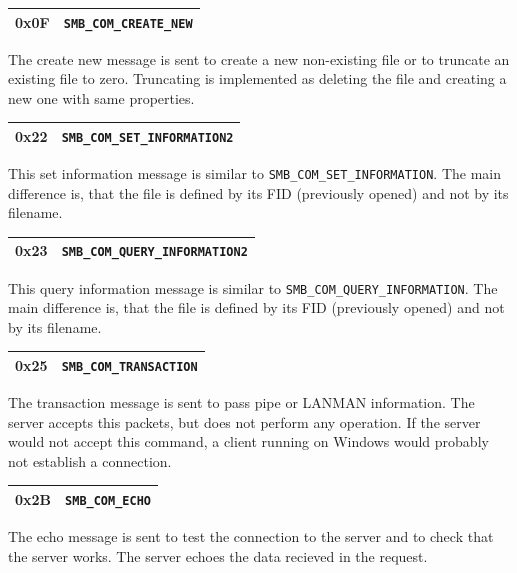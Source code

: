 \documentclass[11pt,a4paper]{book}
\begin{document}
\begin{center}
\renewcommand{\tabcolsep}{5mm}
\begin{tabular}{p{3cm}p{8cm}}
0x0F & \texttt{SMB\_COM\_CREATE\_NEW} \\
\hline
\end{tabular}
\end{center}
The create new message is sent to create a new non-existing file or to truncate an existing file to zero. Truncating is implemented as deleting the file and creating a new one with same properties.

\begin{center}
\renewcommand{\tabcolsep}{5mm}
\begin{tabular}{p{3cm}p{8cm}}
0x22 & \texttt{SMB\_COM\_SET\_INFORMATION2} \\
\hline
\end{tabular}
\end{center}
This set information message is similar to \texttt{SMB\_COM\_SET\_INFORMATION}. The main difference is, that the file is defined by its FID (previously opened) and not by its filename.

\begin{center}
\renewcommand{\tabcolsep}{5mm}
\begin{tabular}{p{3cm}p{8cm}}
0x23 & \texttt{SMB\_COM\_QUERY\_INFORMATION2} \\
\hline
\end{tabular}
\end{center}
This query information message is similar to \texttt{SMB\_COM\_QUERY\_INFORMATION}. The main difference is, that the file is defined by its FID (previously opened) and not by its filename.

\begin{flushleft}
\begin{center}
\renewcommand{\tabcolsep}{5mm}
\begin{tabular}{p{3cm}p{8cm}}
0x25 & \texttt{SMB\_COM\_TRANSACTION} \\
\hline
\end{tabular}
\end{center}
The transaction message is sent to pass pipe or LANMAN information. The server accepts this packets, but does not perform any operation. If the server would not accept this command, a client running on Windows would probably not establish a connection.
\end{flushleft}

\begin{center}
\renewcommand{\tabcolsep}{5mm}
\begin{tabular}{p{3cm}p{8cm}}
0x2B & \texttt{SMB\_COM\_ECHO} \\
\hline
\end{tabular}
\end{center}
The echo message is sent to test the connection to the server and to check that the server works. The server echoes the data recieved in the request.
\end{document}
